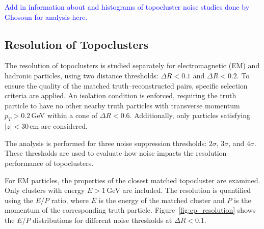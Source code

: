 \textcolor{blue}{Add in information about and histograms of topocluster noise studies done by Ghosoun for analysis here.}
\subsection{Resolution of Topoclusters}

The resolution of topoclusters is studied separately for electromagnetic (EM) and hadronic particles, using two distance thresholds: $\Delta R < 0.1$ and $\Delta R < 0.2$. To ensure the quality of the matched truth–reconstructed pairs, specific selection criteria are applied. An isolation condition is enforced, requiring the truth particle to have no other nearby truth particles with transverse momentum $p_T > 0.2$\,GeV within a cone of $\Delta R < 0.6$. Additionally, only particles satisfying $|z| < 30$\,cm are considered. 

The analysis is performed for three noise suppression thresholds: $2\sigma$, $3\sigma$, and $4\sigma$. These thresholds are used to evaluate how noise impacts the resolution performance of topoclusters.

For EM particles, the properties of the closest matched topocluster are examined. Only clusters with energy $E > 1$\,GeV are included. The resolution is quantified using the $E/P$ ratio, where $E$ is the energy of the matched cluster and $P$ is the momentum of the corresponding truth particle. Figure~\ref{fig:ep_resolution} shows the $E/P$ distributions for different noise thresholds at $\Delta R < 0.1$.

